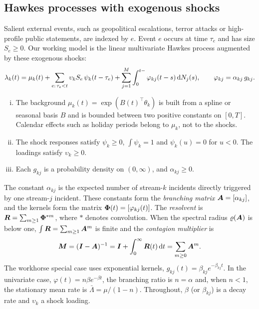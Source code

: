 \subsection{Hawkes processes with exogenous shocks}\label{sec:th-hawkes}

Salient external events, such as geopolitical escalations, terror attacks or
high-profile public statements, are indexed by $e$. Event $e$ occurs at time $\tau_e$
and has size $S_e\ge0$. Our working model is the linear multivariate Hawkes process
\citep{hawkes1971} augmented by these exogenous shocks:
\begin{equation}\label{eq:th-intensity}
  \lambda_k(t)=\mu_k(t)+\sum_{e:\,\tau_e<t}\upsilon_k S_e\,\psi_k(t-\tau_e)
  +\sum_{j=1}^{M}\int_{0}^{t-}\varphi_{kj}(t-s)\,\mathrm{d}N_j(s),
  \qquad \varphi_{kj}=\alpha_{kj}\,g_{kj}.
\end{equation}

\begin{assumption}[Model]\label{ass:th-model}
\begin{enumerate}[(i)]
  \item The background $\mu_k(t)=\exp(B(t)^{\top}\theta_k)$ is built from a spline or
    seasonal basis $B$ and is bounded between two positive constants on $[0,T]$.
    Calendar effects such as holiday periods belong to $\mu_k$, not to the shocks.
  \item The shock responses satisfy $\psi_k\ge0$, $\int\psi_k=1$ and $\psi_k(u)=0$
    for $u<0$. The loadings satisfy $\upsilon_k\ge0$.
  \item Each $g_{kj}$ is a probability density on $(0,\infty)$, and $\alpha_{kj}\ge0$.
\end{enumerate}
\end{assumption}

The constant $\alpha_{kj}$ is the expected number of stream-$k$ incidents directly
triggered by one stream-$j$ incident. These constants form the \emph{branching matrix}
$\bm{A}=[\alpha_{kj}]$, and the kernels form the matrix
$\bm{\Phi}(t)=[\varphi_{kj}(t)]$. The \emph{resolvent} is
$\bm{R}=\sum_{m\ge1}\bm{\Phi}^{*m}$, where $*$ denotes convolution. When the spectral radius
$\varrho(\bm{A})$ is below one, $\int\bm{R}=\sum_{m\ge1}\bm{A}^m$ is finite and the
\emph{contagion multiplier} is
\[
\bm{M}=(\bm{I}-\bm{A})^{-1}=\bm{I}+\int_0^\infty\bm{R}(t)\,\mathrm{d} t=\sum_{m\ge0}\bm{A}^m .
\]
The workhorse special case uses exponential kernels,
$g_{kj}(t)=\beta_{kj}e^{-\beta_{kj}t}$. In the univariate case,
$\varphi(t)=n\beta e^{-\beta t}$, the branching ratio is $n=\alpha$ and, when $n<1$,
the stationary mean rate is $\bar\Lambda=\mu/(1-n)$. Throughout, $\beta$ (or
$\beta_{kj}$) is a decay rate and $\upsilon_k$ a shock loading.

